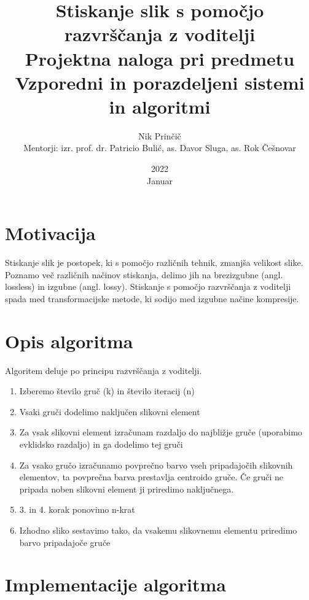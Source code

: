 \documentclass[11pt]{article}
\title{Stiskanje slik s pomočjo razvrščanja z voditelji \\ {\small Projektna naloga pri predmetu Vzporedni in porazdeljeni sistemi in algoritmi}}
\date{2022 \\ Januar}
\author{Nik Prinčič \\[1cm]{\small Mentorji: izr. prof. dr. Patricio Bulić, as. Davor Sluga, as. Rok Češnovar}}
\begin{document}
\maketitle

\newpage

\tableofcontents
\newpage
\listoffigures
\listoftables

\newpage

\section{Motivacija}
Stiskanje slik je postopek, ki s pomočjo različnih tehnik, zmanjša velikost slike.
Poznamo več različnih načinov stiskanja, delimo jih na brezizgubne (angl. lossless) in izgubne (angl. lossy).
Stiskanje s pomočjo razvrščanja z voditelji spada med transformacijske metode, ki sodijo med izgubne načine kompresije.


\section{Opis algoritma}
\label{sec:algorithm}
Algoritem deluje po principu razvrščanja z voditelji.

\begin{enumerate}
    \item Izberemo število gruč (k) in število iteracij (n)
    \item Vsaki gruči dodelimo naključen slikovni element
    \item Za vsak slikovni element izračunam razdaljo do najbližje gruče (uporabimo evklidsko razdaljo) in ga dodelimo tej gruči
    \item Za vsako gručo izračunamo povprečno barvo vseh pripadajočih slikovnih elementov,
          ta povprečna barva prestavlja centroido gruče. Če gruči ne pripada noben slikovni element ji priredimo naključnega.
    \item 3. in 4. korak ponovimo n-krat
    \item Izhodno sliko sestavimo tako, da vsakemu slikovnemu elementu priredimo barvo pripadajoče gruče
\end{enumerate}


\section{Implementacije algoritma}
\end{document}
